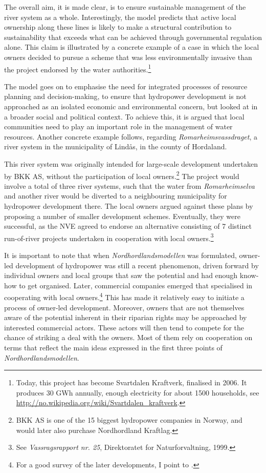 The overall aim, it is made clear, is to ensure sustainable management of the river system as a whole. Interestingly, the model predicts that active local ownership along these lines is likely to make a structural contribution to sustainability that exceeds what can be achieved through governmental regulation alone. This claim is illustrated by a concrete example of a case in which the local owners decided to pursue a scheme that was less environmentally invasive than the project endorsed by the water authorities.\footnote{Today, this project has become Svartdalen Kraftverk, finalised in 2006. It produces 30 GWh annually, enough electricity for about 1500 households, see \url{http://no.wikipedia.org/wiki/Svartdalen_kraftverk}.}

The model goes on to emphasise the need for integrated processes of resource planning and decision-making, to ensure that hydropower development is not approached as an isolated economic and environmental concern, but looked at in a broader social and political context. To achieve this, it is argued that local communities need to play an important role in the management of water resources. Another concrete example follows, regarding {\it Romarheimsvassdraget}, a river system in the municipality of Lindås, in the county of Hordaland.

This river system was originally intended for large-scale development undertaken by BKK AS, without the participation of local owners.\footnote{BKK AS is one of the 15 biggest hydropower companies in Norway, and would later also purchase Nordhordland Kraftlag.} The project would involve a total of three river systems, such that the water from {\it Romarheimselva} and another river would be diverted to a neighbouring municipality for hydropower development there. The local owners argued against these plans by proposing a number of smaller development schemes. Eventually, they were successful, as the NVE agreed to endorse an alternative consisting of 7 distinct run-of-river projects undertaken in cooperation with local owners.\footnote{See {\it Vassragsrapport nr. 25}, Direktoratet for Naturforvaltning, 1999.}

It is important to note that when {\it Nordhordlandsmodellen} was formulated, owner-led development of hydropower was still a recent phenomenon, driven forward by individual owners and local groups that saw the potential and had enough know-how to get organised. Later, commercial companies emerged that specialised in cooperating with local owners.\footnote{For a good survey of the later developments, I point to \cite{larsen06,larsen08,larsen12}.} This has made it relatively easy to initiate a process of owner-led development. Moreover, owners that are not themselves aware of the potential inherent in their riparian rights may be approached by interested commercial actors. These actors will then tend to compete for the chance of striking a deal with the owners. Most of them rely on cooperation on terms that reflect the main ideas expressed in the first three points of {\it Nordhordlandsmodellen}.

